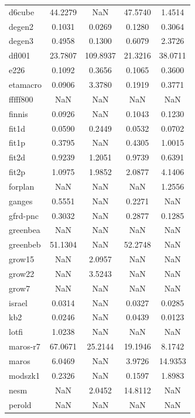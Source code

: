 \begin{longtable}{lcccc}
d6cube   &  44.2279 &      NaN &  47.5740 &   1.4514 \\
degen2   &   0.1031 &   0.0269 &   0.1280 &   0.3064 \\
degen3   &   0.4958 &   0.1300 &   0.6079 &   2.3726 \\
dfl001   &  23.7807 & 109.8937 &  21.3216 &  38.0711 \\
e226     &   0.1092 &   0.3656 &   0.1065 &   0.3600 \\
etamacro &   0.0906 &   3.3780 &   0.1919 &   0.3771 \\
fffff800 &      NaN &      NaN &      NaN &      NaN \\
finnis   &   0.0926 &      NaN &   0.1043 &   0.1230 \\
fit1d    &   0.0590 &   0.2449 &   0.0532 &   0.0702 \\
fit1p    &   0.3795 &      NaN &   0.4305 &   1.0015 \\
fit2d    &   0.9239 &   1.2051 &   0.9739 &   0.6391 \\
fit2p    &   1.0975 &   1.9852 &   2.0877 &   4.1406 \\
forplan  &      NaN &      NaN &      NaN &   1.2556 \\
ganges   &   0.5551 &      NaN &   0.2271 &      NaN \\
gfrd-pnc &   0.3032 &      NaN &   0.2877 &   0.1285 \\
greenbea &      NaN &      NaN &      NaN &      NaN \\
greenbeb &  51.1304 &      NaN &  52.2748 &      NaN \\
grow15   &      NaN &   2.0957 &      NaN &      NaN \\
grow22   &      NaN &   3.5243 &      NaN &      NaN \\
grow7    &      NaN &      NaN &      NaN &      NaN \\
israel   &   0.0314 &      NaN &   0.0327 &   0.0285 \\
kb2      &   0.0246 &      NaN &   0.0439 &   0.0123 \\
lotfi    &   1.0238 &      NaN &      NaN &      NaN \\
maros-r7 &  67.0671 &  25.2144 &  19.1946 &   8.1742 \\
maros    &   6.0469 &      NaN &   3.9726 &  14.9353 \\
modszk1  &   0.2326 &      NaN &   0.1597 &   1.8983 \\
nesm     &      NaN &   2.0452 &  14.8112 &      NaN \\
perold   &      NaN &      NaN &      NaN &      NaN \\

\end{longtable}
